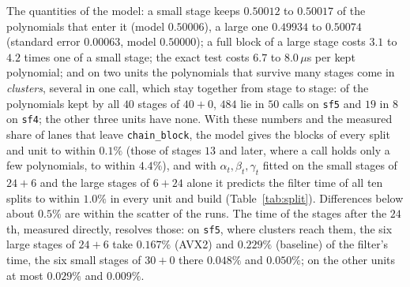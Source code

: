 \documentclass[10pt,a4paper]{article}
\newcommand{\code}[1]{\texttt{#1}}
\theoremstyle{plain}
\theoremstyle{definition}
\begin{document}
The quantities of the model: a small stage keeps $0.50012$ to $0.50017$ of the polynomials that enter it (model $0.50006$), a large one $0.49934$ to $0.50074$ (standard
error $0.00063$, model $0.50000$); a full block of a large stage costs $3.1$ to $4.2$ times one of a small stage; the exact test costs $6.7$ to $8.0\,\mu$s per kept
polynomial; and on two units the polynomials that survive many stages come in \emph{clusters}, several in one call, which stay together from stage to stage: of the
polynomials kept by all $40$ stages of $40+0$, $484$ lie in $50$ calls on \code{sf5} and $19$ in $8$ on \code{sf4}; the other three units have none.  With these
numbers and the measured share of lanes that leave \code{chain\_block}, the model gives the blocks of every split and unit to within $0.1\%$ (those of stages $13$ and
later, where a call holds only a few polynomials, to within $4.4\%$), and with $\alpha_t,\beta_t,\gamma_t$ fitted on the small stages of $24+6$ and the large stages
of $6+24$ alone it predicts the filter time of all ten splits to within $1.0\%$ in every unit and build (Table~\ref{tab:split}).  Differences below about $0.5\%$ are
within the scatter of the runs.  The time of the stages after the $24$th, measured directly, resolves those: on \code{sf5}, where clusters reach them, the six large
stages of $24+6$ take $0.167\%$ (AVX2) and $0.229\%$ (baseline) of the filter's time, the six small stages of $30+0$ there $0.048\%$ and $0.050\%$; on the other units
at most $0.029\%$ and $0.009\%$.
\end{document}
